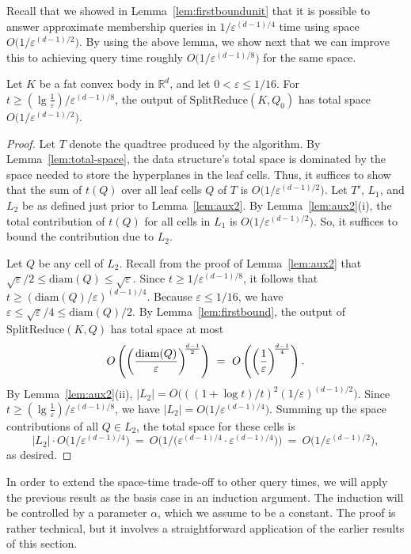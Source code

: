 \documentclass[11pt]{article}   \usepackage[letterpaper,hmargin=2.1cm,vmargin=3cm]{geometry}
\newcommand{\RE}{\mathbb{R}}    \newcommand{\ZZ}{\mathbb{Z}}    \newcommand{\eps}{\varepsilon}  \newcommand{\ST}{\,:\,}         \newcommand{\sq}{\square}
\newcommand{\inv}[1]{\frac{1}{#1}}
\newcommand{\alg}{\textrm{SplitReduce}}
\newcommand{\diam}{\mathrm{diam}}
\begin{document}
Recall that we showed in Lemma~\ref{lem:firstboundunit} that it is possible to answer approximate membership queries in $1/\eps^{(d-1)/4}$ time using space $O\big( 1/\eps^{(d-1)/2} \big)$. By using the above lemma, we show next that we can improve this to achieving query time roughly $O\big( 1/\eps^{(d-1)/8} \big)$ for the same space.

\begin{lemma} \label{lem:baseunit}
Let $K$ be a fat convex body in $\RE^d$, and let $0 < \eps \le 1/16$. For $t \geq (\lg \inv{\eps})/\eps^{(d-1)/8}$, the output of $\alg(K,Q_0)$ has total space $O\big(1/\eps^{(d-1)/2}\big)$.
\end{lemma}


\begin{proof}
Let $T$ denote the quadtree produced by the algorithm. By Lemma~\ref{lem:total-space}, the data structure's total space is dominated by the space needed to store the hyperplanes in the leaf cells. Thus, it suffices to show that the sum of $t(Q)$ over all leaf cells $Q$ of $T$ is $O\big(1/\eps^{(d-1)/2}\big)$. Let $T'$, $L_1$, and $L_2$ be as defined just prior to Lemma~\ref{lem:aux2}. By Lemma~\ref{lem:aux2}(i), the total contribution of $t(Q)$ for all cells in $L_1$ is $O\big( 1/\eps^{(d-1)/2} \big)$. So, it suffices to bound the contribution due to $L_2$.

Let $Q$ be any cell of $L_2$. Recall from the proof of Lemma~\ref{lem:aux2} that $\sqrt{\eps} / 2 \le \diam(Q) \le \sqrt{\eps}$. Since $t \geq 1 / \eps^{(d-1)/8}$, it follows that $t \geq (\diam(Q) / \eps)^{(d-1)/4}$. Because $\eps \le 1/16$, we have $\eps \le \sqrt{\eps}/4 \le \diam(Q)/2$. By Lemma~\ref{lem:firstbound}, the output of $\alg(K,Q)$ has total space at most 
\[
	O\left(\left(\frac{\diam(Q)}{\eps}\right)^{\N \frac{d-1}{2}}\right)
		~ = ~ O\left(\left(\inv{\eps}\right)^{\N \frac{d-1}{4}}\right).
\]
By Lemma~\ref{lem:aux2}(ii), $|L_2| = O\big( ((1 + \log t) / t)^2 (1/\eps)^{(d-1)/2} \big)$. Since $t \geq (\lg \inv{\eps})/\eps^{(d-1)/8}$, we have $|L_2| = O\big(1/\eps^{(d-1)/4}\big)$. Summing up the space contributions of all $Q \in L_2$, the total space for these cells is 
\[
	|L_2| \cdot O\big(1/\eps^{(d-1)/4}\big)
	~ = ~ O\big(1/\big(\eps^{(d-1)/4} \cdot \eps^{(d-1)/4}\big)\big)
	~ = ~ O\big(1/\eps^{(d-1)/2}\big),
\]
as desired. 
\end{proof}


In order to extend the space-time trade-off to other query times, we will apply the previous result as the basis case in an induction argument. The induction will be controlled by a parameter $\alpha$, which we assume to be a constant. The proof is rather technical, but it involves a straightforward application of the earlier results of this section.
\end{document}
